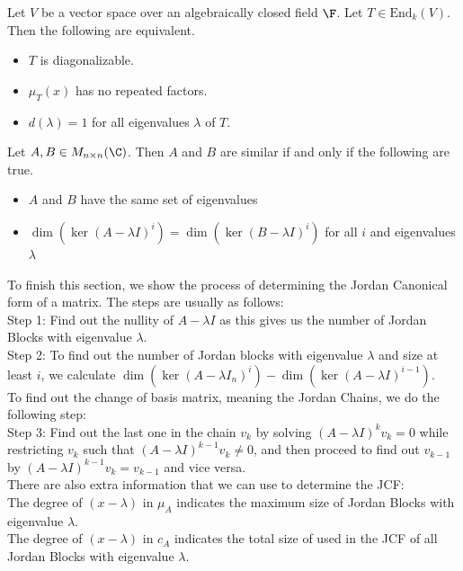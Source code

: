 \documentclass[a4paper]{article}
\begin{document}
\begin{prp}{}{} Let $V$ be a vector space over an algebraically closed field $\F$. Let $T\in\text{End}_k(V)$. Then the following are equivalent. 
\begin{itemize}
\item $T$ is diagonalizable. 
\item $\mu_T(x)$ has no repeated factors. 
\item $d(\lambda)=1$ for all eigenvalues $\lambda$ of $T$. 
\end{itemize}
\end{prp}

\begin{prp}{}{} Let $A,B\in M_{n\times n}(\C)$. Then $A$ and $B$ are similar if and only if the following are true. 
\begin{itemize}
\item $A$ and $B$ have the same set of eigenvalues
\item $\dim(\ker(A-\lambda I)^i)=\dim(\ker(B-\lambda I)^i)$ for all $i$ and eigenvalues $\lambda$ 
\end{itemize}
\end{prp}

To finish this section, we show the process of determining the Jordan Canonical form of a matrix. The steps are usually as follows: \\
Step 1: Find out the nullity of $A-\lambda I$ as this gives us the number of Jordan Blocks with eigenvalue $\lambda$. \\
Step 2: To find out the number of Jordan blocks with eigenvalue $\lambda$ and size at least $i$, we calculate $\dim(\ker(A-\lambda I_n)^i)-\dim(\ker(A-\lambda I)^{i-1})$. \\
To find out the change of basis matrix, meaning the Jordan Chains, we do the following step: \\
Step 3: Find out the last one in the chain $v_k$ by solving $(A-\lambda I)^kv_k=0$ while restricting $v_k$ such that $(A-\lambda I)^{k-1}v_k\neq 0$, and then proceed to find out $v_{k-1}$ by $(A-\lambda I)^{k-1}v_k=v_{k-1}$ and vice versa. \\

There are also extra information that we can use to determine the JCF: \\
The degree of $(x-\lambda)$ in $\mu_A$ indicates the maximum size of Jordan Blocks with eigenvalue $\lambda$. \\
The degree of $(x-\lambda)$ in $c_A$ indicates the total size of used in the JCF of all Jordan Blocks with eigenvalue $\lambda$. \\
\end{document}
